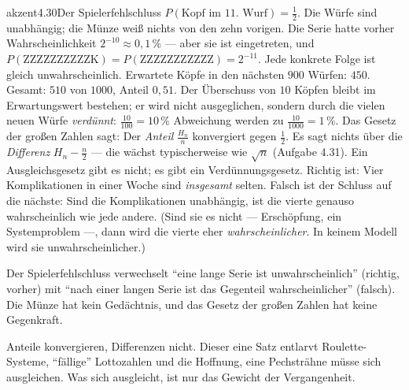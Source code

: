 \begin{loesungkarte}{akzent}{4.30}{Der Spielerfehlschluss}
$P(\text{Kopf im 11.\ Wurf}) = \frac12$. Die Würfe sind unabhängig; die Münze weiß nichts von den zehn vorigen. Die Serie hatte vorher Wahrscheinlichkeit $2^{-10}\approx0{,}1\,\%$ --- aber sie ist eingetreten, und $P(\text{ZZZZZZZZZZK}) = P(\text{ZZZZZZZZZZZ}) = 2^{-11}$. Jede konkrete Folge ist gleich unwahrscheinlich.
Erwartete Köpfe in den nächsten $900$ Würfen: $450$. Gesamt: $510$ von $1000$, Anteil $0{,}51$. Der Überschuss von $10$ Köpfen bleibt im Erwartungswert bestehen; er wird nicht ausgeglichen, sondern durch die vielen neuen Würfe \emph{verdünnt}: $\frac{10}{100} = 10\,\%$ Abweichung werden zu $\frac{10}{1000} = 1\,\%$.
Das Gesetz der großen Zahlen sagt: Der \emph{Anteil} $\frac{H_n}n$ konvergiert gegen $\frac12$. Es sagt nichts über die \emph{Differenz} $H_n - \frac n2$ --- die wächst typischerweise wie $\sqrt n$ (Aufgabe 4.31). Ein Ausgleichsgesetz gibt es nicht; es gibt ein Verdünnungsgesetz.
Richtig ist: Vier Komplikationen in einer Woche sind \emph{insgesamt} selten. Falsch ist der Schluss auf die nächste: Sind die Komplikationen unabhängig, ist die vierte genauso wahrscheinlich wie jede andere. (Sind sie es nicht --- Erschöpfung, ein Systemproblem ---, dann wird die vierte eher \emph{wahrscheinlicher}. In keinem Modell wird sie unwahrscheinlicher.)
\begin{fehler}\kastentext
Der Spielerfehlschluss verwechselt \enquote{eine lange Serie ist unwahrscheinlich} (richtig, vorher) mit \enquote{nach einer langen Serie ist das Gegenteil wahrscheinlicher} (falsch). Die Münze hat kein Gedächtnis, und das Gesetz der großen Zahlen hat keine Gegenkraft.
\end{fehler}
\begin{mitnehmen}\kastentext
Anteile konvergieren, Differenzen nicht. Dieser eine Satz entlarvt Roulette-Systeme, \enquote{fällige} Lottozahlen und die Hoffnung, eine Pechsträhne müsse sich ausgleichen. Was sich ausgleicht, ist nur das Gewicht der Vergangenheit.
\end{mitnehmen}
\end{loesungkarte}

